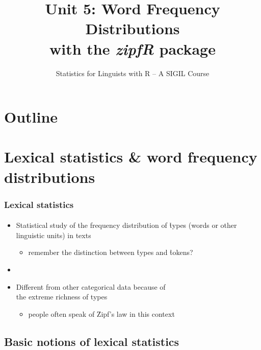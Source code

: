 \documentclass[handout,notes=show,t]{beamer} %
\title[5.\ WFD \& zipfR]{Unit 5: Word Frequency Distributions\\ 
  with the \emph{zipfR} package}
\subtitle{Statistics for Linguists with R -- A SIGIL Course}
\date[sigil.r-forge.r-project.org]{%
  \light{\tiny \sigilcopyright}}
\begin{document}
\frame{\titlepage}


\section*{Outline}

\section{Lexical statistics \& word frequency distributions}

\begin{frame}
  \frametitle{Lexical statistics}
  \framesubtitle{\citet{Zipf:49,Zipf:65,Baayen:01,Baroni:08}}

  \begin{itemize}
  \item Statistical study of the frequency distribution of \h{types} (words or
    other linguistic units) in texts
    \begin{itemize}
    \item remember the distinction between \h{types} and \h{tokens}?
    \end{itemize}
  \item[]
  \item Different from other categorical data because of\\
    the extreme richness of types
    \begin{itemize}
    \item people often speak of \h{Zipf's law} in this context
    \end{itemize}
  \end{itemize}
\end{frame} 

\subsection{Basic notions of lexical statistics}
\end{document}
